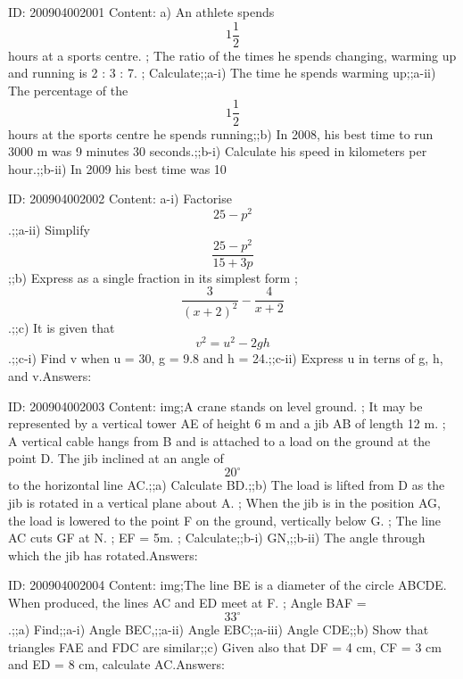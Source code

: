 \documentclass{article}
\begin{document}
ID: 200904002001
Content:
a) An athlete spends $$1 \frac{1}{2}$$ hours at a sports centre. ; The ratio of the times he spends changing, warming up and running is 2 : 3 : 7. ; Calculate;;a-i) The time he spends warming up;;a-ii) The percentage of the $$1 \frac{1}{2}$$ hours at the sports centre he spends running;;b) In 2008, his best time to run 3000 m was 9 minutes 30 seconds.;;b-i) Calculate his speed in kilometers per hour.;;b-ii) In 2009 his best time was 10%

ID: 200904002002
Content:
a-i) Factorise $$25 - p^2$$.;;a-ii) Simplify $$\frac{25 - p^2}{15 + 3p}$$;;b) Express as a single fraction in its simplest form ; $$\frac{3}{(x+2)^2} - \frac{4}{x + 2}$$.;;c) It is given that $$v^2 = u^2 - 2gh$$.;;c-i) Find v when u = 30, g = 9.8 and h = 24.;;c-ii) Express u in terns of g, h, and v.Answers:

ID: 200904002003
Content:
img;A crane stands on level ground. ; It may be represented by a vertical tower AE of height 6 m and a jib AB of length 12 m. ; A vertical cable hangs from B and is attached to a load on the ground at the point D. The jib inclined at an angle of $$20^{\circ}$$ to the horizontal line AC.;;a) Calculate BD.;;b) The load is lifted from D as the jib is rotated in a vertical plane about A. ; When the jib is in the position AG, the load is lowered to the point F on the ground, vertically below G. ; The line AC cuts GF at N. ; EF = 5m. ; Calculate;;b-i) GN,;;b-ii) The angle through which the jib has rotated.Answers:

ID: 200904002004
Content:
img;The line BE is a diameter of the circle ABCDE. When produced, the lines AC and ED meet at F. ; Angle BAF = $$33^{\circ}$$.;;a) Find;;a-i) Angle BEC,;;a-ii) Angle EBC;;a-iii) Angle CDE;;b) Show that triangles FAE and FDC are similar;;c) Given also that DF = 4 cm, CF = 3 cm and ED = 8 cm, calculate AC.Answers:
\end{document}
